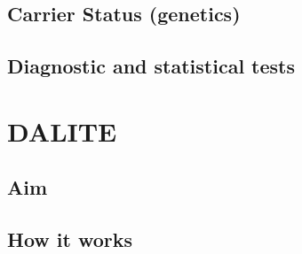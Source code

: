 \documentclass[]{book}
\begin{document}
\hypertarget{carrier-status-genetics-1}{%
\section{Carrier Status (genetics)}\label{carrier-status-genetics-1}}

\hypertarget{diagnostic-and-statistical-tests-1}{%
\section{Diagnostic and statistical tests}\label{diagnostic-and-statistical-tests-1}}

\hypertarget{dalite}{%
\chapter{DALITE}\label{dalite}}

\hypertarget{aim-1}{%
\section{Aim}\label{aim-1}}

\hypertarget{how-it-works-1}{%
\section{How it works}\label{how-it-works-1}}


\end{document}
